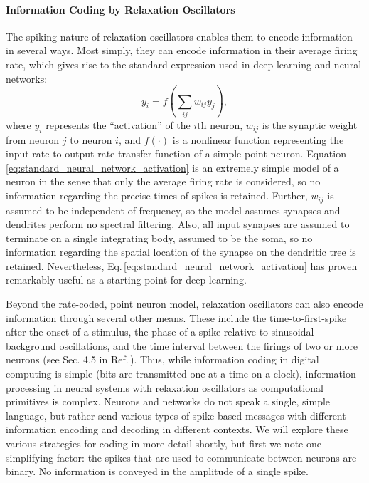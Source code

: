 \documentclass[twocolumn]{article}
\begin{document}
\paragraph{Information Coding by Relaxation Oscillators}
The spiking nature of relaxation oscillators enables them to encode information in several ways. Most simply, they can encode information in their average firing rate, which gives rise to the standard expression used in deep learning and neural networks:
\begin{equation}
\label{eq:standard_neural_network_activation} 
y_i = f(\sum_{ij}w_{ij}y_j),
\end{equation}
where $y_i$ represents the ``activation'' of the $i$th neuron, $w_{ij}$ is the synaptic weight from neuron $j$ to neuron $i$, and $f(\cdot)$ is a nonlinear function representing the input-rate-to-output-rate transfer function of a simple point neuron. Equation \ref{eq:standard_neural_network_activation} is an extremely simple model of a neuron in the sense that only the average firing rate is considered, so no information regarding the precise times of spikes is retained. Further, $w_{ij}$ is assumed to be independent of frequency, so the model assumes synapses and dendrites perform no spectral filtering. Also, all input synapses are assumed to terminate on a single integrating body, assumed to be the soma, so no information regarding the spatial location of the synapse on the dendritic tree is retained. Nevertheless, Eq.\,\ref{eq:standard_neural_network_activation} has proven remarkably useful as a starting point for deep learning. 

Beyond the rate-coded, point neuron model, relaxation oscillators can also encode information through several other means. These include the time-to-first-spike after the onset of a stimulus, the phase of a spike relative to sinusoidal background oscillations, and the time interval between the firings of two or more neurons (see Sec. 4.5 in Ref.\,\cite{geki2002}). Thus, while information coding in digital computing is simple (bits are transmitted one at a time on a clock), information processing in neural systems with relaxation oscillators as computational primitives is complex. Neurons and networks do not speak a single, simple language, but rather send various types of spike-based messages with different information encoding and decoding in different contexts. We will explore these various strategies for coding in more detail shortly, but first we note one simplifying factor: the spikes that are used to communicate between neurons are binary. No information is conveyed in the amplitude of a single spike.
\end{document}
